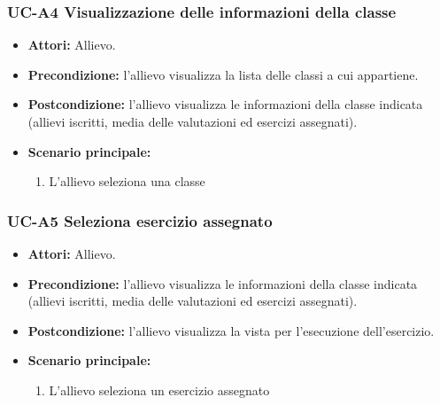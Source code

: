 	\subsubsection{UC-A4 Visualizzazione delle informazioni della classe}
		\begin{itemize}
			\item \textbf{Attori:} Allievo.
			\item \textbf{Precondizione:} l'allievo visualizza la lista delle classi a cui appartiene.
			\item \textbf{Postcondizione:} l'allievo visualizza le informazioni della classe indicata (allievi iscritti, media delle valutazioni ed esercizi assegnati).
			\item \textbf{Scenario principale:}
			\begin{enumerate}
				\item L'allievo seleziona una classe
			\end{enumerate}
		\end{itemize}
		
\subsubsection{UC-A5 Seleziona esercizio assegnato}
\begin{itemize}
			\item \textbf{Attori:} Allievo.
			\item \textbf{Precondizione:} l'allievo visualizza le informazioni della classe indicata (allievi iscritti, media delle valutazioni ed esercizi assegnati).
			\item \textbf{Postcondizione:} l'allievo visualizza la vista per l'esecuzione dell'esercizio.
			\item \textbf{Scenario principale:}
			\begin{enumerate}
				\item L'allievo seleziona un esercizio assegnato
			\end{enumerate}
		\end{itemize}
